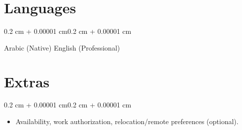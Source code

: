 \documentclass[10pt, letterpaper]{article}
\newenvironment{highlightsforbulletentries}{
  \begin{itemize}[
    topsep=0.10 cm,
    parsep=0.10 cm,
    partopsep=0pt,
    itemsep=0pt,
    leftmargin=10pt
  ]}
  {\end{itemize}
}
\newenvironment{onecolentry}{
  \begin{adjustwidth}{0.2 cm + 0.00001 cm}{0.2 cm + 0.00001 cm}
}{
  \end{adjustwidth}
}
\begin{document}
\section{Languages}
\begin{onecolentry}
  Arabic (Native) \quad\AND\quad English (Professional)
\end{onecolentry}

\section{Extras}
\begin{onecolentry}
  \begin{highlightsforbulletentries}
    \item {Availability, work authorization, relocation/remote preferences (optional).}
  \end{highlightsforbulletentries}
\end{onecolentry}
\end{document}
